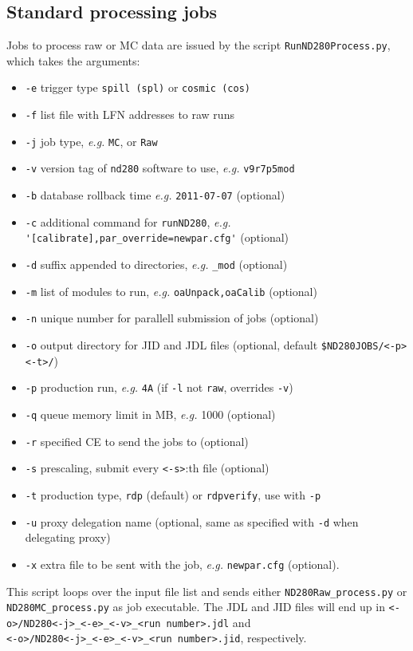 \documentclass[11pt]{article}
\begin{document}
\subsection{Standard processing jobs}
Jobs to process raw or MC data are issued by the script \verb+RunND280Process.py+, which takes the arguments:
\begin{itemize}
\item \verb+-e+ trigger type \verb+spill (spl)+ or \verb+cosmic (cos)+
\item \verb+-f+ list file with LFN addresses to raw runs
\item \verb+-j+ job type, \textit{e.g.} \verb+MC+, or \verb+Raw+
\item \verb+-v+ version tag of \verb+nd280+ software to use, \textit{e.g.} \verb+v9r7p5mod+
\item \verb+-b+ database rollback time \textit{e.g.} \verb+2011-07-07+ (optional)
\item \verb+-c+ additional command for \verb+runND280+, \textit{e.g.} \verb+'[calibrate],par_override=newpar.cfg'+ (optional)
\item \verb+-d+ suffix appended to directories, \textit{e.g.} \verb+_mod+ (optional)
\item \verb+-m+ list of modules to run, \textit{e.g.} \verb+oaUnpack,oaCalib+ (optional)
\item \verb+-n+ unique number for parallell submission of jobs (optional)
\item \verb+-o+ output directory for JID and JDL files (optional, default \verb+$ND280JOBS/<-p><-t>/+)
\item \verb+-p+ production run, \textit{e.g.} \verb+4A+ (if \verb+-l+ not \verb+raw+, overrides \verb+-v+)
\item \verb+-q+ queue memory limit in MB, \textit{e.g.} 1000 (optional)
\item \verb+-r+ specified CE to send the jobs to (optional)
\item \verb+-s+ prescaling, submit every \verb+<-s>+:th file (optional)
\item \verb+-t+ production type, \verb+rdp+ (default) or \verb+rdpverify+, use with \verb+-p+
\item \verb+-u+ proxy delegation name (optional, same as specified with \verb+-d+ when delegating proxy)
\item \verb+-x+ extra file to be sent with the job, \textit{e.g.} \verb+newpar.cfg+ (optional).
\end{itemize}

This script loops over the input file list and sends either
\verb+ND280Raw_process.py+ or \verb+ND280MC_process.py+ as job
executable. The JDL and JID files will end up in
\verb+<-o>/ND280<-j>_<-e>_<-v>_<run number>.jdl+ and\\
\verb+<-o>/ND280<-j>_<-e>_<-v>_<run number>.jid+, respectively.
\end{document}

